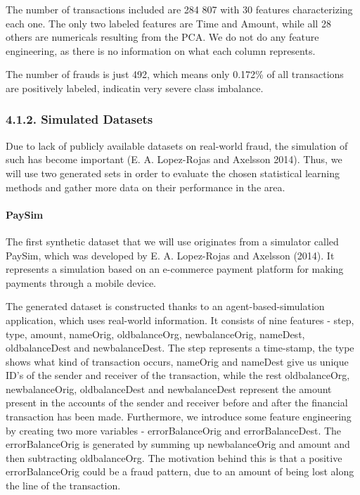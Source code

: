 \documentclass[12pt,]{article}
\let\oldparagraph\paragraph
\renewcommand{\paragraph}[1]{\oldparagraph{#1}\mbox{}}
\begin{document}
The number of transactions included are 284 807 with 30 features
characterizing each one. The only two labeled features are Time and
Amount, while all 28 others are numericals resulting from the PCA. We do
not do any feature engineering, as there is no information on what each
column represents.

The number of frauds is just 492, which means only 0.172\% of all
transactions are positively labeled, indicatin very severe class
imbalance.

\hypertarget{simulated-datasets}{%
\subsubsection{4.1.2. Simulated Datasets}\label{simulated-datasets}}

Due to lack of publicly available datasets on real-world fraud, the
simulation of such has become important (E. A. Lopez-Rojas and Axelsson
2014). Thus, we will use two generated sets in order to evaluate the
chosen statistical learning methods and gather more data on their
performance in the area.

\hypertarget{paysim}{%
\paragraph{PaySim}\label{paysim}}

The first synthetic dataset that we will use originates from a simulator
called PaySim, which was developed by E. A. Lopez-Rojas and Axelsson
(2014). It represents a simulation based on an e-commerce payment
platform for making payments through a mobile device.

The generated dataset is constructed thanks to an agent-based-simulation
application, which uses real-world information. It consists of nine
features - step, type, amount, nameOrig, oldbalanceOrg, newbalanceOrig,
nameDest, oldbalanceDest and newbalanceDest. The step represents a
time-stamp, the type shows what kind of transaction occurs, nameOrig and
nameDest give us unique ID's of the sender and receiver of the
transaction, while the rest oldbalanceOrg, newbalanceOrig,
oldbalanceDest and newbalanceDest represent the amount present in the
accounts of the sender and receiver before and after the financial
transaction has been made. Furthermore, we introduce some feature
engineering by creating two more variables - errorBalanceOrig and
errorBalanceDest. The errorBalanceOrig is generated by summing up
newbalanceOrig and amount and then subtracting oldbalanceOrg. The
motivation behind this is that a positive errorBalanceOrig could be a
fraud pattern, due to an amount of being lost along the line of the
transaction.
\end{document}
